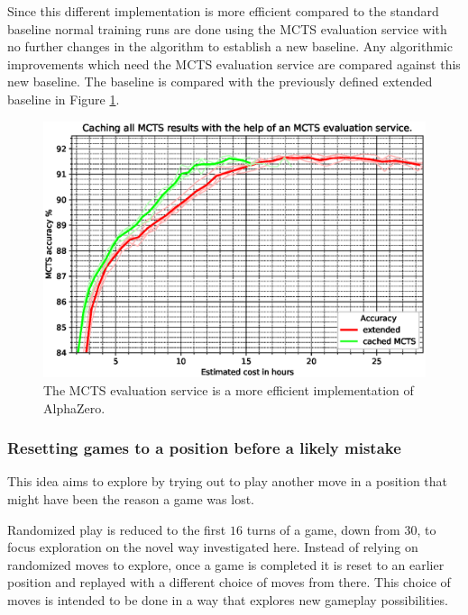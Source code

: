 \documentclass[12pt,onecolumn,oneside,titlepage]{article}
\begin{document}
Since this different implementation is more efficient compared to the standard baseline normal training runs are done using the MCTS evaluation service with no further changes in the algorithm to establish a new baseline.
Any algorithmic improvements which need the MCTS evaluation service are compared against this new baseline. The baseline is compared with the previously defined extended baseline in Figure \ref{fig:cache_play}.

\begin{figure}[H]
\centering
\includegraphics[clip,width=\columnwidth]{cache_play}
\caption{The MCTS evaluation service is a more efficient implementation of AlphaZero.}
\label{fig:cache_play}
\end{figure}





\subsubsection{Resetting games to a position before a likely mistake}

This idea aims to explore by trying out to play another move in a position that might have been the reason a game was lost.

Randomized play is reduced to the first $16$ turns of a game, down from $30$, to focus exploration on the novel way investigated here.
Instead of relying on randomized moves to explore, once a game is completed it is reset to an earlier position and replayed with a different choice of moves from there. This choice of moves is intended to be done in a way that explores new gameplay possibilities.
\end{document}
